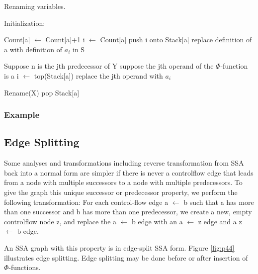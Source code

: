 \begin{algorithm}
\caption{Renaming variables.}\label{alg:Renaming variables}
\begin{algorithmic}
\State Initialization:

\EndFor

\EndFor
\EndIf
{}

\State Count[a] $\gets$ Count[a]+1
\State i $\gets$ Count[a]
\State push i onto Stack[a]
\State replace definition of a with definition of $a_i$ in S
\EndFor
\EndFor

\State Suppose n is the jth predecessor of Y
\State suppose the jth operand of the $\Phi$-function is a
\State i $\gets$ top(Stack[a])
\State replace the jth operand with $a_i$

\EndFor
\EndFor
{}
\State Rename(X)
\EndFor
{}
\State pop Stack[a]
\EndFor
\end{algorithmic}
\end{algorithm}

\subsubsection{Example} 






\subsection{Edge Splitting}

Some analyses and transformations including reverse transformation from SSA back into a normal form are simpler if there is never a controlflow edge that leads from a node with multiple successors to a node with multiple predecessors. To give the graph this unique successor or predecessor property, we perform the following transformation: For each control-flow edge a $\gets$ b such that a has more than one successor and b has more than one predecessor, we create a new, empty controlflow node z, and replace the a $\gets$ b edge with an a $\gets$ z edge and a z $\gets$ b edge.

An SSA graph with this property is in edge-split SSA form. Figure \ref{fig:p44} illustrates edge splitting. Edge splitting may be done before or after insertion of $\Phi$-functions.